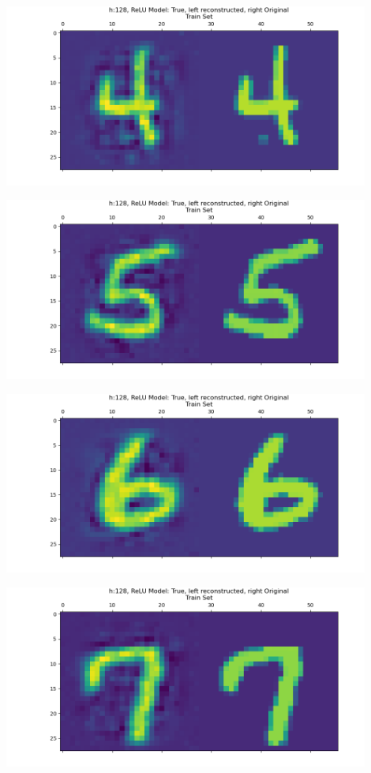 \documentclass[]{article}
\begin{document}
            \begin{center}
                \includegraphics*[width=12cm]{A4plots/06-57-23-h-128-nonlin-digit-4.png}
            \end{center}
            \begin{center}
                \includegraphics*[width=12cm]{A4plots/06-57-23-h-128-nonlin-digit-5.png}
            \end{center}
            \begin{center}
                \includegraphics*[width=12cm]{A4plots/06-57-23-h-128-nonlin-digit-6.png}
            \end{center}
            \begin{center}
                \includegraphics*[width=12cm]{A4plots/06-57-23-h-128-nonlin-digit-7.png}
            \end{center}
\end{document}

